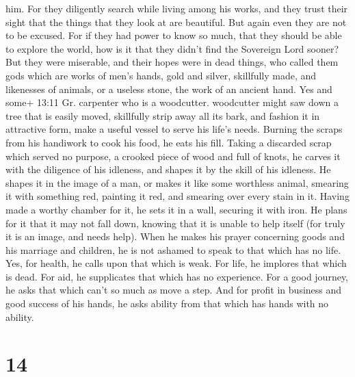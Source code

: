 him.  For they diligently search while living among his
works, and they trust their sight that the things that they look at are
beautiful.  But again even they are not to be excused.
 For if they had power to know so much, that they should be
able to explore the world, how is it that they didn't find the Sovereign
Lord sooner?  But they were miserable, and their hopes were
in dead things, who called them gods which are works of men's hands,
gold and silver, skillfully made, and likenesses of animals, or a
useless stone, the work of an ancient hand.  Yes and some+
13:11 Gr. carpenter who is a woodcutter. woodcutter might saw down a
tree that is easily moved, skillfully strip away all its bark, and
fashion it in attractive form, make a useful vessel to serve his life's
needs.  Burning the scraps from his handiwork to cook his
food, he eats his fill.  Taking a discarded scrap which
served no purpose, a crooked piece of wood and full of knots, he carves
it with the diligence of his idleness, and shapes it by the skill of his
idleness. He shapes it in the image of a man,  or makes it
like some worthless animal, smearing it with something red, painting it
red, and smearing over every stain in it.  Having made a
worthy chamber for it, he sets it in a wall, securing it with iron.
 He plans for it that it may not fall down, knowing that it
is unable to help itself (for truly it is an image, and needs help).
 When he makes his prayer concerning goods and his marriage
and children, he is not ashamed to speak to that which has no life.
 Yes, for health, he calls upon that which is weak. For
life, he implores that which is dead. For aid, he supplicates that which
has no experience. For a good journey, he asks that which can't so much
as move a step.  And for profit in business and good
success of his hands, he asks ability from that which has hands with no
ability.

\hypertarget{section-9}{%
\section{14}\label{section-9}}

